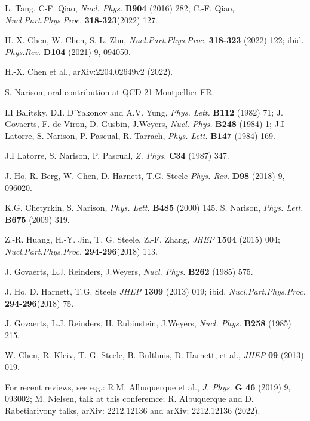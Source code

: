  L. Tang, C-F. Qiao, {\it Nucl. Phys.} {\bf B904} (2016) 282; C.-F. Qiao,   {\it Nucl.Part.Phys.Proc.} {\bf 318-323}(2022) 127. 

H.-X. Chen, W. Chen, S.-L. Zhu, {\it Nucl.Part.Phys.Proc.} {\bf 318-323} (2022) 122; ibid. {\it Phys.Rev.} {\bf D104} (2021) 9, 094050.

 H.-X. Chen et al., arXiv:2204.02649v2 (2022).

 S. Narison, oral contribution at QCD 21-Montpellier-FR. 

  I.I Balitsky, D.I. D'Yakonov and A.V. Yung, {\it Phys. Lett.} {\bf B112} (1982) 71; 
J. Govaerts, F. de Viron, D. Gusbin, J.Weyers, {\it Nucl. Phys.} {\bf B248} (1984) 1; 
J.I Latorre, S. Narison, P. Pascual, R. Tarrach,  {\it Phys. Lett.} {\bf B147} (1984) 169.

J.I Latorre, S. Narison, P. Pascual, {\it  Z. Phys.} {\bf C34}
(1987) 347. 

 J. Ho, R. Berg, W. Chen, D. Harnett, T.G. Steele {\it Phys. Rev.} {\bf D98} (2018) 9, 096020.
 
   K.G. Chetyrkin, S. Narison, {\it Phys. Lett.} {\bf B485} (2000) 145.
   S. Narison, {\it Phys. Lett.} {\bf B675} (2009) 319.

 Z.-R. Huang, H.-Y. Jin, T. G. Steele, Z.-F. Zhang,  {\it JHEP} {\bf 1504} (2015) 004;
{\it Nucl.Part.Phys.Proc.} {\bf 294-296}(2018) 113.
 
 
  J. Govaerts, L.J. Reinders, J.Weyers, {\it Nucl. Phys.} {\bf B262} (1985) 575.
 
 J. Ho,  D. Harnett, T.G. Steele {\it JHEP} {\bf 1309} (2013) 019;
ibid, {\it Nucl.Part.Phys.Proc.} {\bf 294-296}(2018)  75.

  J. Govaerts, L.J. Reinders, H. Rubinstein, J.Weyers, {\it Nucl. Phys.} {\bf B258} (1985) 215.
 
  W. Chen, R. Kleiv, T. G. Steele, B. Bulthuis, D. Harnett, et al., {\it JHEP} {\bf 09} (2013) 019.
 
  For recent reviews, see e.g.: R.M. Albuquerque et al.,
{\it J. Phys.} {\bf G 46} (2019) 9, 093002; M. Nielsen, talk at this conferemce;  R. Albuquerque and D. Rabetiarivony talks, arXiv: 2212.12136 and arXiv: 2212.12136 (2022). 


